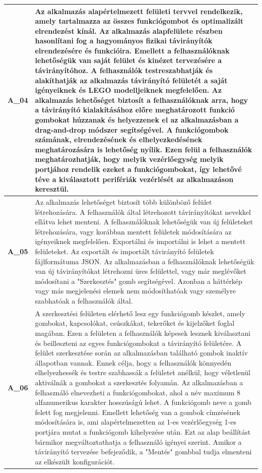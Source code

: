 \documentclass{article}
\begin{document}
\begin{longtable}{|c|p{14cm}|}
       \textbf{A\_04}  & Az alkalmazás alapértelmezett felületi tervvel rendelkezik, amely tartalmazza az összes funkciógombot és optimalizált elrendezést kínál. Az alkalmazás alapfelülete részben hasonlítani fog a hagyományos fizikai távirányítók elrendezésére és funkcióira. Emellett a felhasználóknak lehetőségük van saját felület és kinézet tervezésére a távirányítóhoz. A felhasználók testreszabhatják és alakíthatják az alkalmazás távirányító felületét a saját igényeiknek és LEGO modelljeiknek megfelelően. Az alkalmazás lehetőséget biztosít a felhasználóknak arra, hogy a távirányító kialakításához előre meghatározott funkció gombokat húzzanak és helyezzenek el az alkalmazásban a drag-and-drop módszer segítségével. A funkciógombok számának, elrendezésének és elhelyezkedésének meghatározására is lehetőség nyílik. Ezen felül a felhasználók meghatározhatják, hogy melyik vezérlőegység melyik portjához rendelik ezeket a funkciógombokat, így lehetővé téve a kiválasztott perifériák vezérlését az alkalmazáson keresztül. \\\hline
       
       \textbf{A\_05}  & Az alkalmazás lehetőséget biztosít több különböző felület létrehozására. A felhasználók által létrehozott távirányítókat nevekkel ellátva lehet menteni. A felhasználóknak lehetőségük van új felületeket létrehozására, vagy korábban mentett felületek módosítására az igényeiknek megfelelően. Exportálni és importálni is lehet a mentett felületeket. Az exportált és importált távirányító felületek fájlformátuma JSON. Az alkalmazásban a felhasználóknak lehetőségük van új távirányítókat létrehozni üres felülettel, vagy már meglévőket módosítani a "Szerkesztés" gomb segítségével. Azonban a háttérkép vagy más megjelenési elemek nem módosíthatóak vagy személyre szabhatóak a felhasználók által. \\\hline
       
       \textbf{A\_06}  & A szerkesztési felületen elérhető lesz egy funkciógomb készlet, amely gombokat, kapcsolókat, csúszkákat, tekerőket és kijelzőket foglal magában. Ezen a felületen a felhasználók képesek lesznek kiválasztani és beilleszteni az egyes funkciógombokat a távirányító felületére. A felület szerkesztése során az alkalmazásban található gombok inaktív állapotban vannak. Ennek célja, hogy a felhasználók könnyedén elhelyezhessék és testre szabhassák a felületet anélkül, hogy véletlenül aktiválnák a gombokat a szerkesztés folyamán. Az alkalmazásban a felhasználó elnevezheti a funkciógombokat, ahol a név maximum 8 alfanumerikus karakter hosszúságú lehet. A funkciógomb neve a gomb felett fog megjelenni. Emellett lehetőség van a gombok címzésének módosítására is, ami alapértelmezetten az 1-es vezérlőegység 1-es portjára mutat a funkciógomb kihelyezése után. Ezt az alap beállítást bármikor megváltoztathatja a felhasználó igényei szerint. Amikor a távirányító tervezése befejeződik, a "Mentés" gombbal tudja elmenteni az elkészült konfigurációt. \\\hline


\end{longtable}
\end{document}
